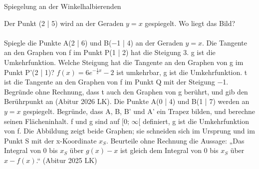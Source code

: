 \setcounter{aufgabe}{10}

\begin{aufgabe}{Spiegelung an der Winkelhalbierenden}
\begin{teile}
\teil Der Punkt (2 | 5) wird an der Geraden $y = x$ gespiegelt. Wo liegt das Bild?  \\  \\ 
\teil Spiegle die Punkte A(2 | 6) und B(−1 | 4) an der Geraden $y = x$.
\teil Die Tangente an den Graphen von f im Punkt P(1 | 2) hat die Steigung 3. g ist die Umkehrfunktion. Welche Steigung hat die Tangente an den Graphen von g im Punkt P'(2 | 1)? \leerfeld
\teil $f(x) = 6e^{-\frac{1}{2}x} - 2$ ist umkehrbar, g ist die Umkehrfunktion. t ist die Tangente an den Graphen von f im Punkt Q mit der Steigung −1. Begründe ohne Rechnung, dass t auch den Graphen von g berührt, und gib den Berührpunkt an \hfill (Abitur 2026 LK).
\teil Die Punkte A(0 | 4) und B(1 | 7) werden an $y = x$ gespiegelt. Begründe, dass A, B, B' und A' ein Trapez bilden, und berechne seinen Flächeninhalt. \leerfeld
\teil f und g sind auf $[0;\, \infty[$ definiert, g ist die Umkehrfunktion von f. Die Abbildung zeigt beide Graphen; sie schneiden sich im Ursprung und im Punkt S mit der x-Koordinate $x_S$. Beurteile ohne Rechnung die Aussage: „Das Integral von 0 bis $x_S$ über $g(x) - x$ ist gleich dem Integral von 0 bis $x_S$ über $x - f(x)$.“ \hfill (Abitur 2025 LK)

\begin{ksys}[xmin=0,xmax=5,ymin=0,ymax=5,ablesen]    \end{ksys}
\end{teile}
\end{aufgabe}

